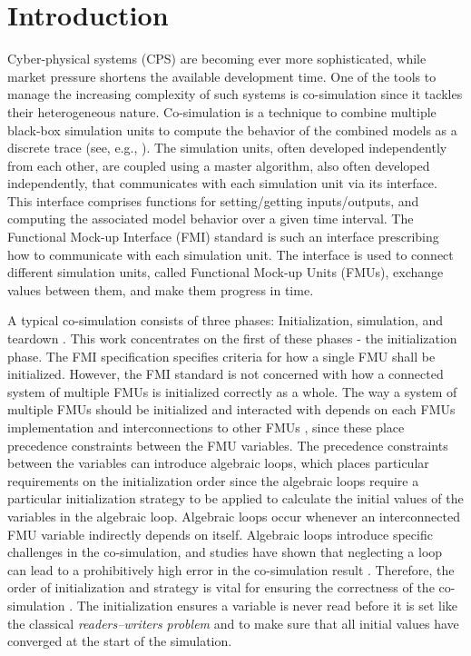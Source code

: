 \section{Introduction}\label{sc:introduction}
Cyber-physical systems (CPS) are becoming ever more sophisticated, while market pressure shortens the available development time. One of the tools to manage the increasing complexity of such systems is co-simulation since it tackles their heterogeneous nature. Co-simulation is a technique to combine multiple black-box simulation units to compute the behavior of the combined models as a discrete trace (see, e.g., \cite{Kubler2000, Gomes2018}). The simulation units, often developed independently from each other, are coupled using a master algorithm, also often developed independently, that communicates with each simulation unit via its interface. This interface comprises functions for setting/getting inputs/outputs, and computing the associated model behavior over a given time interval.
The Functional Mock-up Interface (FMI) standard \cite{Blochwitz2012, fmi_2019} is such an interface prescribing how to communicate with each simulation unit. The interface is used to connect different simulation units, called Functional Mock-up Units (FMUs), exchange values between them, and make them progress in time.

A typical co-simulation consists of three phases: Initialization, simulation, and teardown \cite{Thule2019b}. This work concentrates on the first of these phases - the initialization phase. The FMI specification specifies criteria for how a single FMU shall be initialized. However, the FMI standard is not concerned with how a connected system of multiple FMUs is initialized correctly as a whole. 
The way a system of multiple FMUs should be initialized and interacted with depends on each FMUs implementation and interconnections to other FMUs \cite{gomes_lucio_vangheluwe_2019}, since these place precedence constraints between the FMU variables. The precedence constraints between the variables can introduce algebraic loops, which places particular requirements on the initialization order since the algebraic loops require a particular initialization strategy to be applied to calculate the initial values of the variables in the algebraic loop\cite{Bastian2011a}. Algebraic loops occur whenever an interconnected FMU variable indirectly depends on itself. Algebraic loops introduce specific challenges in the co-simulation, and studies have shown that neglecting a loop can lead to a prohibitively high error in the co-simulation result \cite{Arnold2014}. Therefore, the order of initialization and strategy is vital for ensuring the correctness of the co-simulation \cite{Thule2018}. The initialization ensures a variable is never read before it is set like the classical \textit{readers–writers problem} and to make sure that all initial values have converged at the start of the simulation. 

